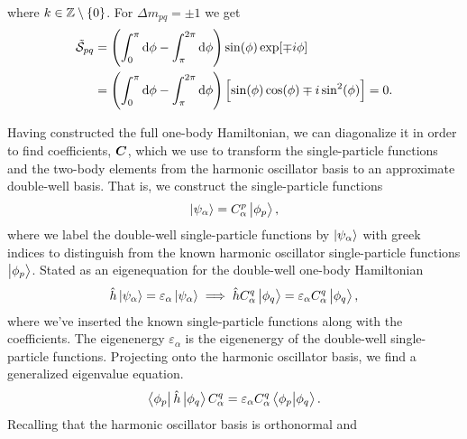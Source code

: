         where $k \in \mathbb{Z} \setminus \left\{ 0 \right\}$.
        For $\Delta m_{pq} = \pm 1$ we get
        \begin{align}
            \tilde{\mathcal{S}}_{pq}
            &= \left( 
                \int_{0}^{\pi} \dd \phi
                - \int_{\pi}^{2\pi} \dd \phi
             \right)
            \sin(\phi) \exp[\mp i \phi]
            \\
            &= \left( 
                \int_{0}^{\pi} \dd \phi
                - \int_{\pi}^{2\pi} \dd \phi
             \right)
            \left[ 
                \sin(\phi)\cos(\phi)
                \mp i\sin^2(\phi)
             \right]
            = 0.
        \end{align}

        Having constructed the full one-body Hamiltonian, we can diagonalize it
        in order to find coefficients, $\boldsymbol{C}$, which we use to transform the
        single-particle functions and the two-body elements from the harmonic
        oscillator basis to an approximate double-well basis.
        That is, we construct the single-particle functions
        \begin{align}
            \ket{\psi_{\alpha}} = C^{p}_{\alpha}\ket{\phi_p},
        \end{align}
        where we label the double-well single-particle functions by
        $\ket{\psi_{\alpha}}$ with greek indices to distinguish from the known
        harmonic oscillator single-particle functions $\ket{\phi_p}$.
        Stated as an eigenequation for the double-well one-body Hamiltonian
        \begin{gather}
            \hat{h} \ket{\psi_{\alpha}}
            = \varepsilon_{\alpha} \ket{\psi_{\alpha}}
            \implies
            \hat{h} C^{q}_{\alpha} \ket{\phi_q}
            = \varepsilon_{\alpha} C^{q}_{\alpha} \ket{\phi_q},
        \end{gather}
        where we've inserted the known single-particle functions along with the
        coefficients.
        The eigenenergy $\varepsilon_{\alpha}$ is the eigenenergy of the
        double-well single-particle functions.
        Projecting onto the harmonic oscillator basis, we find a generalized
        eigenvalue equation.
        \begin{gather}
            \bra{\phi_{p}}\hat{h}\ket{\phi_q} C^{q}_{\alpha}
            = \varepsilon_{\alpha} C^{q}_{\alpha} \braket{\phi_{p}}{\phi_{q}}.
        \end{gather}
        Recalling that the harmonic oscillator basis is orthonormal and

